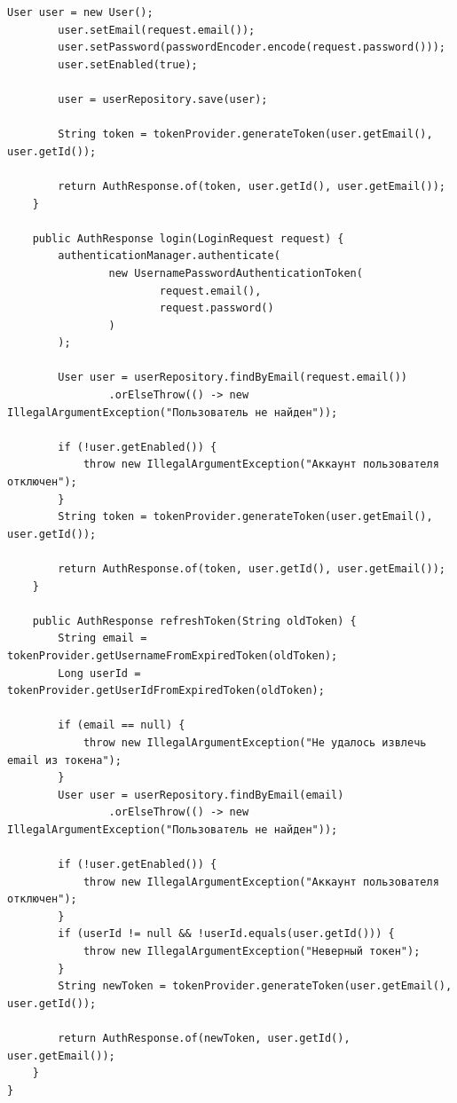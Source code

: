 \begin{lstlisting}[basicstyle=\tiny\ttfamily,breaklines=true]
        User user = new User();
        user.setEmail(request.email());
        user.setPassword(passwordEncoder.encode(request.password()));
        user.setEnabled(true);

        user = userRepository.save(user);

        String token = tokenProvider.generateToken(user.getEmail(), user.getId());

        return AuthResponse.of(token, user.getId(), user.getEmail());
    }

    public AuthResponse login(LoginRequest request) {
        authenticationManager.authenticate(
                new UsernamePasswordAuthenticationToken(
                        request.email(),
                        request.password()
                )
        );

        User user = userRepository.findByEmail(request.email())
                .orElseThrow(() -> new IllegalArgumentException("Пользователь не найден"));

        if (!user.getEnabled()) {
            throw new IllegalArgumentException("Аккаунт пользователя отключен");
        }
        String token = tokenProvider.generateToken(user.getEmail(), user.getId());

        return AuthResponse.of(token, user.getId(), user.getEmail());
    }

    public AuthResponse refreshToken(String oldToken) {
        String email = tokenProvider.getUsernameFromExpiredToken(oldToken);
        Long userId = tokenProvider.getUserIdFromExpiredToken(oldToken);

        if (email == null) {
            throw new IllegalArgumentException("Не удалось извлечь email из токена");
        }
        User user = userRepository.findByEmail(email)
                .orElseThrow(() -> new IllegalArgumentException("Пользователь не найден"));

        if (!user.getEnabled()) {
            throw new IllegalArgumentException("Аккаунт пользователя отключен");
        }
        if (userId != null && !userId.equals(user.getId())) {
            throw new IllegalArgumentException("Неверный токен");
        }
        String newToken = tokenProvider.generateToken(user.getEmail(), user.getId());

        return AuthResponse.of(newToken, user.getId(), user.getEmail());
    }
}
\end{lstlisting}

